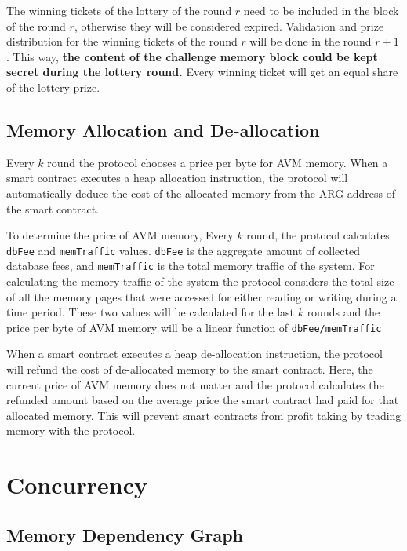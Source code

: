 \documentclass[11pt, A4]{report}
\begin{document}
    The winning tickets of the lottery of the round \(r\) need to be included in the block of the round \(r\),
    otherwise they will be considered expired. Validation and prize distribution for the winning tickets of the round
    \(r\) will be done in the round \(r + 1\). This way, \textbf{the content of the challenge memory block could be
    kept secret during the lottery round.} Every winning ticket will get an equal share of the lottery prize.

    \subsection{Memory Allocation and De-allocation}\label{subsec:memory-allocation-and-de-allocation}

    Every \(k\) round the protocol chooses a price per byte for AVM memory. When a smart contract executes a heap
    allocation instruction, the protocol will automatically deduce the cost of the allocated memory from the ARG
    address of the smart contract.

    To determine the price of AVM memory, Every \(k\) round, the protocol calculates \texttt{dbFee} and
    \texttt{memTraffic} values. \texttt{dbFee} is the aggregate amount of collected database fees, and
    \texttt{memTraffic} is the total memory traffic of the system. For calculating the memory traffic of the system
    the protocol considers the total size of all the memory pages that were accessed for either reading or writing
    during a time period. These two values will be calculated for the last \(k\) rounds and the price per byte of
    AVM memory will be a linear function of \texttt{dbFee/memTraffic}

    When a smart contract executes a heap de-allocation instruction, the protocol will refund the cost of
    de-allocated memory to the smart contract. Here, the current price of AVM memory does not matter and the protocol
    calculates the refunded amount based on the average price the smart contract had paid for that allocated memory.
    This will prevent smart contracts from profit taking by trading memory with the protocol.


    \section{Concurrency}\label{sec:concurrency}

    \subsection{Memory Dependency Graph}\label{subsec:memory-dependency-graph}
\end{document}
